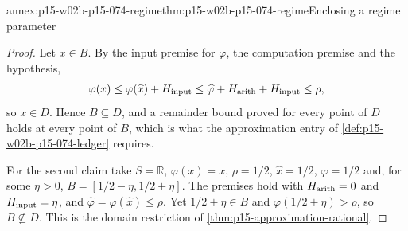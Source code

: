 \begin{annexitem}{annex:p15-w02b-p15-074-regime}{thm:p15-w02b-p15-074-regime}{Enclosing a regime parameter}
\begin{proof}
Let \(x\in B\). By the input premise for \(\varphi\), the computation
premise and the hypothesis,
\[
 \varphi(x)\leq\varphi(\widehat x)+H_{\rm input}
 \leq\widehat\varphi+H_{\rm arith}+H_{\rm input}\leq\rho,
\]
so \(x\in D\). Hence \(B\subseteq D\), and a remainder bound proved for
every point of \(D\) holds at every point of \(B\), which is what the
approximation entry of \cref{def:p15-w02b-p15-074-ledger} requires.

For the second claim take \(S=\mathbb R\), \(\varphi(x)=x\),
\(\rho=1/2\), \(\widehat x=1/2\), \(\widehat\varphi=1/2\) and, for some
\(\eta>0\), \(B=[1/2-\eta,1/2+\eta]\). The premises hold with
\(H_{\rm arith}=0\) and \(H_{\rm input}=\eta\), and
\(\widehat\varphi=\varphi(\widehat x)\leq\rho\). Yet
\(1/2+\eta\in B\) and \(\varphi(1/2+\eta)>\rho\), so
\(B\not\subseteq D\). This is the domain restriction of
\cref{thm:p15-approximation-rational}.
\end{proof}
\end{annexitem}

